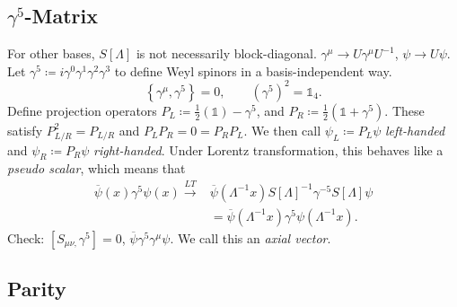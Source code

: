\subsection{\texorpdfstring{$\gamma^5$-}{Gamma five }Matrix}%
\label{sub:gamma_five_matrix}

For other bases, $S[\Lambda]$ is not necessarily block-diagonal.
$\gamma^{\mu} \to U \gamma^{\mu} U^{-1}$, $\psi \to U \psi$. Let $\gamma^5 \coloneqq i \gamma^0 \gamma^1 \gamma^2 \gamma^3$ to define Weyl spinors in a basis-independent way.
\begin{equation}
  \left\{ \gamma^{\mu}, \gamma^5 \right\} = 0, \qquad (\gamma^5)^2 = \mathbb{1}_4.
\end{equation}
Define projection operators $P_L \coloneqq \frac{1}{2} (\mathbb{1}) - \gamma^5$, and $P_R \coloneqq \frac{1}{2} (\mathbb{1} + \gamma^5)$. These satisfy $P_{L/R}^2 = P_{L/R}$ and $P_L P_R = 0 = P_R P_L$.
We then call $\psi_L \coloneqq P_L \psi$ \emph{left-handed} and $\psi_R \coloneqq P_R \psi$ \emph{right-handed}.
Under Lorentz transformation, this behaves like a \emph{pseudo scalar}, which means that
\begin{align}
  \overline{\psi}(x) \gamma^5 \psi(x) \xrightarrow{LT} &\overline{\psi}(\Lambda^{-1}x) S[\Lambda]^{-1} \gamma^{-5} S[\Lambda] \psi \\
						       &=\overline{\psi}(\Lambda^{-1} x) \gamma^5 \psi (\Lambda^{-1} x).
\end{align}
Check: $[S_{\mu\nu,} \gamma^5] = 0$, $\overline{\psi}\gamma^5 \gamma^{\mu} \psi$. We call this an \emph{axial vector}.

\subsection{Parity}%
\label{sub:parity}

